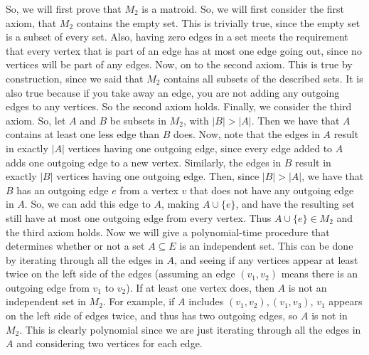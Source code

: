 \documentclass{article}
\begin{document}
So, we will first prove that $M_2$ is a matroid. So,
we will first consider the first axiom, that $M_2$ contains the empty set. This
is trivially true, since the empty set is a subset of every set. Also, having
zero edges in a set meets the requirement that every vertex that is part of an
edge has at most one edge going out, since no vertices will be part of any edges.
Now, on to the second axiom. This is true by construction, since we said that
$M_2$ contains all subsets of the described sets. It is also true because if you
take away an edge, you are not adding any outgoing edges to any vertices. So the
second axiom holds. Finally, we consider the third axiom. So, let $A$ and $B$ be
subsets in $M_2$, with $|B| > |A|$. Then we have that $A$ contains at least one
less edge than $B$ does. Now, note that the edges in $A$ result in exactly $|A|$
vertices having one outgoing edge, since every edge added to $A$ adds one
outgoing edge to a new vertex. Similarly, the edges in $B$ result in exactly
$|B|$ vertices having one outgoing edge. Then, since $|B| > |A|$, we have that
$B$ has an outgoing edge $e$ from a vertex $v$ that does not have any outgoing edge
in $A$. So, we can add this edge to $A$, making $A \cup \{e\}$, and have the
resulting set still have at most one outgoing edge from every vertex. Thus $A
\cup \{e\} \in M_2$ and the third axiom holds. Now we will give a
polynomial-time procedure that determines whether or not a set $A \subseteq E$ is an
independent set. This can be done by iterating through all the edges in $A$, and
seeing if any vertices appear at least twice on the left side of the
edges (assuming an edge $(v_1,
v_2)$ means there is an outgoing edge from $v_1$ to $v_2$). If at least one
vertex does, then $A$ is not an independent set in $M_2$. For example, if $A$
includes $(v_1, v_2), (v_1, v_3)$, $v_1$ appears on the left side of edges
twice, and thus has two outgoing edges, so $A$ is not in $M_2$. This is clearly
polynomial since we are just iterating through all the edges in $A$ and
considering two vertices for each edge.
\end{document}
